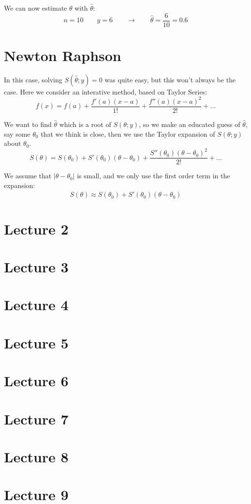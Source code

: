 \documentclass[english,12pt]{article}
\theoremstyle{plain}
\theoremstyle{definition}
\theoremstyle{definition} %
\begin{document}
We can now estimate $\theta$ with $\hat\theta$:
\[n=10\qquad y=6\qquad\rightarrow\qquad  \hat\theta=\frac{6}{10}=0.6\]

\section{Newton Raphson}
In this case, solving $S(\hat\theta;y)=0$ was quite easy, but this won't always be the case.  Here we consider an interative method, based on Taylor Series:
\[f(x)=f(a)+\frac{f'(a)(x-a)}{1!}+\frac{f''(a)(x-a)^2}{2!}+\ldots\]

We want to find $\hat\theta$ which is a root of $S(\theta;y)$, so we make an educated guess of $\hat\theta$, say some $\theta_0$ that we think is close, then we use the Taylor expansion of $S(\theta;y)$ about $\theta_0$.
\[S(\theta)=S(\theta_0)+S'(\theta_0)(\theta-\theta_0)+\frac{S''(\theta_0)(\theta-\theta_0)^2}{2!}+\ldots\]

We assume that $|\theta-\theta_0|$ is small, and we only use the first order term in the expansion:
\begin{align*}
S(\theta)\approx S(\theta_0) +S'(\theta_0)(\theta-\theta_0)
\end{align*}

\section*{Lecture 2}
\section*{Lecture 3}
\section*{Lecture 4}
\section*{Lecture 5}
\section*{Lecture 6}
\section*{Lecture 7}
\section*{Lecture 8}
\section*{Lecture 9}
\end{document}
